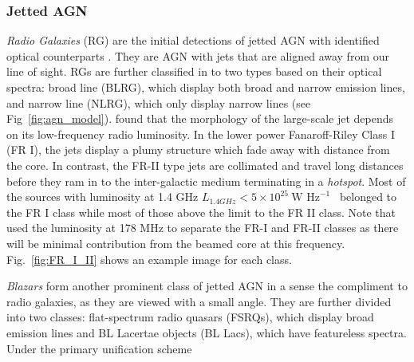 \subsubsection{Jetted AGN}
\textit{Radio Galaxies} (RG) are the initial detections of jetted AGN with identified optical counterparts \citep[e.g.,][]{1954ApJ...119..215B}. They are AGN with jets that are aligned away from our line of sight. RGs are further classified in to two types based on their optical spectra: broad line (BLRG), which display both broad and narrow emission lines, and narrow line (NLRG), which only display narrow lines  (see Fig~\ref{fig:agn_model}).  \citet{fanaroff1974morphology} found that the morphology of the large-scale jet depends on its low-frequency radio luminosity. In the lower power Fanaroff-Riley Class I (FR I), the jets display a plumy structure which fade away with distance from the core. In contrast, the FR-II type jets are collimated and travel long distances before they ram in to the inter-galactic medium terminating in a \textit{hotspot}. Most of the sources with luminosity at 1.4 GHz $L_{1.4GHz}<5\times10^{25}~\text{W Hz}^{-1}$~
belonged to the FR I class while most of those above the limit to the FR II class. Note that \citet{fanaroff1974morphology} used the luminosity at 178 MHz to separate the FR-I and FR-II classes as there will be minimal contribution from the beamed core at this frequency.  Fig.~\ref{fig:FR_I_II} shows an example image for each class.
\begin{figure*}
    \caption{Typical example images for the FR I and II classes. (a) shows an FR-I source, 3C272.1, image taken from DRAGN (http://www.jb.man.ac.uk/atlas/). The brightness of the jet gradually decreases away from the central nucleus (\textit{the core}). (b) shows an FR-II source, Cygnus A, taken from NED (http://ned.ipac.caltech.edu). Two bright hotspots and associated radio lobes lie on either side of the core that are connected by an otherwise invisible jet.\label{fig:FR_I_II} }
\end{figure*}
\textit{Blazars} form another prominent class of jetted AGN in a sense the compliment to radio galaxies, as they are viewed with a small angle. They are further divided into two classes: flat-spectrum radio quasars (FSRQs), which display broad emission lines and BL Lacertae objects (BL Lacs), which have featureless spectra. Under the primary unification scheme 
